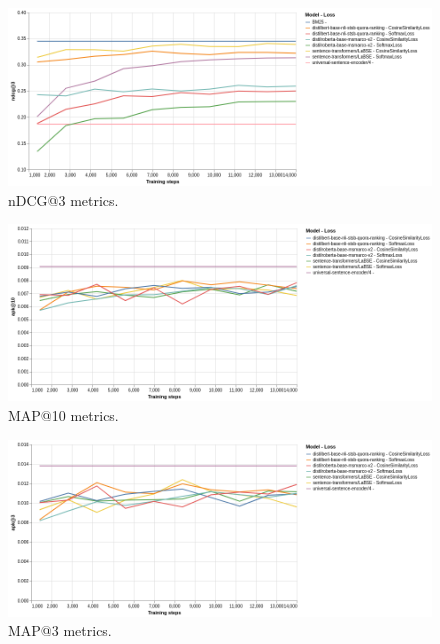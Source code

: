 \documentclass{article}
\begin{document}
\begin{figure}[!tbh]
    \centering
    \includegraphics[width=1\linewidth]{visualization_ndcg3.png}
    \caption{nDCG@3 metrics.}
    \label{fig:ndcg3}
\end{figure}

\begin{figure}[!tbh]
    \centering
    \includegraphics[width=1\linewidth]{visualization_apk10.png}
    \caption{MAP@10 metrics.}
    \label{fig:apk10}
\end{figure}

\begin{figure}[!tbh]
    \centering
    \includegraphics[width=1\linewidth]{visualization_apk3.png}
    \caption{MAP@3 metrics.}
    \label{fig:apk3}
\end{figure}

\clearpage
\end{document}

